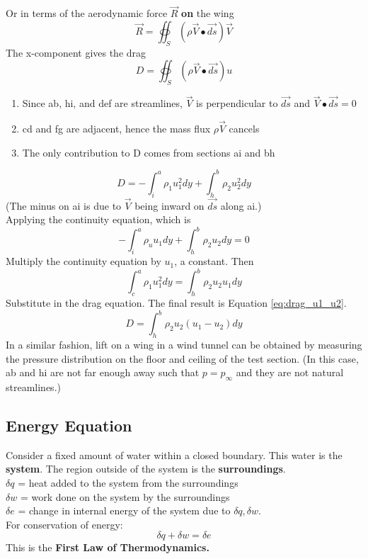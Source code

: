 \documentclass[draft=false, titlepage]{article}
\begin{document}
Or in terms of the aerodynamic force $\vec{R}$ \textbf{on} the wing
\begin{equation*}
    \vec{R} = \oiint_S (\rho \vec{V} \bullet\vec{ds}) \vec{V}
\end{equation*}
The x-component gives the drag
\begin{equation*}
    D = \oiint_S (\rho \vec{V} \bullet\vec{ds}) u
\end{equation*}
\begin{enumerate}
    \item Since ab, hi, and def are streamlines, $\vec{V}$ is perpendicular to $\vec{ds}$ and $\vec{V} \bullet \vec{ds} = 0$
    \item cd and fg are adjacent, hence the mass flux $\rho \vec{V}$ cancels
    \item The only contribution to D comes from sections ai and bh
\end{enumerate}
\begin{equation*}
    D = -\int_i^a\rho_1 u_1^2 dy + \int_h^b \rho_2 u_2^2 dy
\end{equation*}
(The minus on ai is due to $\vec{V}$ being inward on $\vec{ds}$ along ai.)\\
Applying the continuity equation, which is
\begin{equation*}
    -\int_i^a \rho_u u_1 dy + \int_h^b \rho_2 u_2 dy = 0
\end{equation*}
Multiply the continuity equation by $u_1$, a constant. Then
\begin{equation*}
    \int_c^a \rho_1 u_1^2 dy = \int_h^b \rho_2 u_2 u_1 dy
\end{equation*}
Substitute in the drag equation. The final result is Equation \ref{eq:drag_u1_u2}.
\begin{equation}
    D = \int_h^b \rho_2 u_2(u_1-u_2) dy
    \label{eq:drag_u1_u2}
\end{equation}
In a similar fashion, lift on a wing in a wind tunnel can be obtained by measuring the pressure distribution on the floor and ceiling of the test section. (In this case, ab and hi are not far enough away such that $p=p_\infty$ and they are not natural streamlines.)

\subsection{Energy Equation}
Consider a fixed amount of water within a closed boundary. This water is the \textbf{system}. The region outside of the system is the \textbf{surroundings}.\\
$\delta q$ = heat added to the system from the surroundings\\
$\delta w$ = work done on the system by the surroundings\\
$\delta e$ = change in internal energy of the system due to $\delta q, \delta w$.\\
For conservation of energy:
\begin{equation*}
    \delta q + \delta w = \delta e
\end{equation*}
This is the \textbf{First Law of Thermodynamics.}
\end{document}
